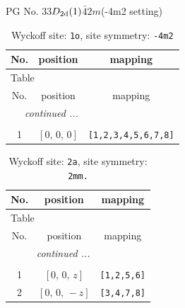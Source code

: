 \documentclass[fleqn,8pt]{jsarticle}
\begin{document}
\setcounter{MaxMatrixCols}{32}

\renewcommand{\tablename}{Table~}
\renewcommand{\figurename}{Figure~}
\begin{center}
\LARGE
PG No. 33\quad$D_{\rm 2d}(1)$\quad$\bar{4}2m$\quad(-4m2 setting)\quad[ tetragonal ]
\end{center}
\renewcommand{\arraystretch}{1.2}
\begin{longtable}{ccc}
\caption{Wyckoff site: {\tt 1o}, site symmetry: {\tt -4m2}}
 \\
 \hline \hline
No. & position & mapping \\ \hline \endfirsthead

\multicolumn{2}{l}{\tablename\ \thetable{}} \\
 \hline \hline
No. & position & mapping \\ \hline \endhead

 \hline \hline
\multicolumn{2}{r}{\footnotesize\it continued ...} \\ \endfoot

 \hline \hline
\multicolumn{2}{r}{} \\ \endlastfoot

1 & $\left[ 0,\, 0,\, 0 \right]$ & {\tt [1,2,3,4,5,6,7,8]} \\
\end{longtable}
\renewcommand{\arraystretch}{1.2}
\begin{longtable}{ccc}
\caption{Wyckoff site: {\tt 2a}, site symmetry: {\tt 2mm.}}
 \\
 \hline \hline
No. & position & mapping \\ \hline \endfirsthead

\multicolumn{2}{l}{\tablename\ \thetable{}} \\
 \hline \hline
No. & position & mapping \\ \hline \endhead

 \hline \hline
\multicolumn{2}{r}{\footnotesize\it continued ...} \\ \endfoot

 \hline \hline
\multicolumn{2}{r}{} \\ \endlastfoot

1 & $\left[ 0,\, 0,\, z \right]$ & {\tt [1,2,5,6]} \\ \hline
2 & $\left[ 0,\, 0,\, - z \right]$ & {\tt [3,4,7,8]} \\
\end{longtable}
\renewcommand{\arraystretch}{1.2}
\end{document}
